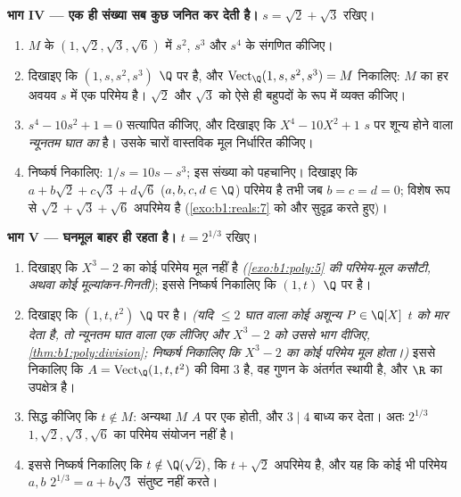 \begin{problem}
\medskip \noindent\textbf{भाग IV --- एक ही संख्या सब कुछ जनित कर देती है।}
$s = \sqrt2 + \sqrt3$ रखिए।
\begin{enumerate}[resume]
  \item $M$ के  $(1, \sqrt2, \sqrt3, \sqrt6)$ में $s^2$, $s^3$ और $s^4$
  के  संगणित कीजिए।
  \item दिखाइए कि $(1, s, s^2, s^3)$ $\Q$ पर  है, और
  $\operatorname{Vect}_\Q(1, s, s^2, s^3) = M$ निकालिए: $M$ का हर अवयव $s$
  में एक परिमेय  है। $\sqrt2$ और $\sqrt3$ को ऐसे ही बहुपदों के रूप में
  व्यक्त कीजिए।
  \item $s^4 - 10s^2 + 1 = 0$ सत्यापित कीजिए, और दिखाइए कि $X^4 - 10X^2 + 1$
  $s$ पर शून्य होने वाला \emph{न्यूनतम घात का } है। उसके
  चारों वास्तविक मूल निर्धारित कीजिए।
  \item निष्कर्ष निकालिए: $1/s = 10s - s^3$; इस संख्या को पहचानिए। दिखाइए कि
  $a + b\sqrt2 + c\sqrt3 + d\sqrt6$ ($a,b,c,d \in \Q$) परिमेय है तभी जब $b =
  c = d = 0$; विशेष रूप से $\sqrt2 + \sqrt3 + \sqrt6$ अपरिमेय है
  (\cref{exo:b1:reals:7} को और सुदृढ़ करते हुए)।
\end{enumerate}

\medskip \noindent\textbf{भाग V --- घनमूल बाहर ही रहता है।} $t = 2^{1/3}$
रखिए।
\begin{enumerate}[resume]
  \item दिखाइए कि $X^3 - 2$ का कोई परिमेय मूल नहीं है
  \emph{(\cref{exo:b1:poly:5} की परिमेय-मूल कसौटी, अथवा कोई
  मूल्यांकन-गिनती)}; इससे निष्कर्ष निकालिए कि $(1, t)$ $\Q$ पर  है।
  \item दिखाइए कि $(1, t, t^2)$ $\Q$ पर  है। \emph{(यदि $\leq 2$ घात
  वाला कोई अशून्य $P \in \Q[X]$ $t$ को मार देता है, तो न्यूनतम घात वाला एक
  लीजिए और $X^3 - 2$ को उससे भाग दीजिए, \cref{thm:b1:poly:division};
  निष्कर्ष निकालिए कि $X^3 - 2$ का कोई परिमेय मूल होता।)} इससे निकालिए कि $A
  = \operatorname{Vect}_\Q(1, t, t^2)$ की विमा $3$ है, वह गुणन के अंतर्गत
  स्थायी है, और $\R$ का उपक्षेत्र है।
  \item सिद्ध कीजिए कि $t \notin M$: अन्यथा $M$  $A$ पर एक  होती, और  $3 \mid 4$ बाध्य कर देता। अतः $2^{1/3}$ $1,
  \sqrt2, \sqrt3, \sqrt6$ का परिमेय संयोजन नहीं है।
  \item इससे निष्कर्ष निकालिए कि $t \notin \Q(\sqrt2)$, कि $t + \sqrt2$
  अपरिमेय है, और यह कि कोई भी परिमेय $a, b$ $2^{1/3} = a + b\sqrt3$ संतुष्ट
  नहीं करते।
\end{enumerate}


\end{problem}
